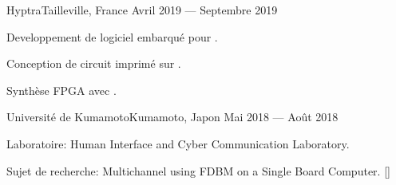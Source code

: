 
    {Hyptra}{Tailleville, France}
    {Avril 2019 --- Septembre 2019}
    {\begin{additems}
        \item Developpement de logiciel embarqué pour .
        \item Conception de circuit imprimé sur .
        \item Synthèse FPGA avec .
    \end{additems}}

    {Université de Kumamoto}{Kumamoto, Japon}
    {Mai 2018 --- Ao\^ut 2018}
    {\begin{additems} %
        \item Laboratoire: Human Interface and Cyber Communication Laboratory.
        \item Sujet de recherche: Multichannel  using FDBM on a Single Board Computer. []
    \end{additems}}

